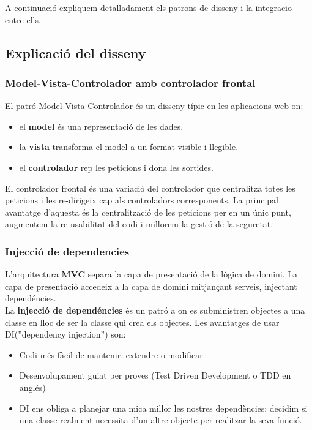 A continuació expliquem detalladament els patrons de disseny i la integracio entre ells.

\subsection{Explicaci\'{o} del disseny}
\subsubsection{Model-Vista-Controlador amb controlador frontal}
El patró Model-Vista-Controlador \'{e}s un disseny t\'{i}pic en les aplicacions web on:
\begin{itemize}
\item el \textbf{model} \'{e}s una representaci\'{o} de les dades.
\item la \textbf{vista} transforma el model a un format visible i llegible.
\item el \textbf{controlador} rep les peticions i dona les sortides.
\end{itemize}
El controlador frontal \'{e}s una variació del controlador que centralitza totes les peticions i les re-dirigeix cap als controladors corresponents. La principal avantatge d'aquesta \'{e}s la centralització de les peticions per en un únic punt, augmentem la re-usabilitat del codi i millorem la gestió de la seguretat.

\subsubsection{Injecció de dependencies}
L'arquitectura \textbf{MVC} separa la capa de presentaci\'{o} de la l\`{o}gica de domini. La capa de presentaci\'{o} accedeix a la capa de domini mitjançant serveis, injectant depend\'{e}ncies. \\

La \textbf{injecci\'{o} de depend\'{e}ncies} \'{e}s un patr\'{o} a on es subministren objectes a una classe en lloc de ser la classe qui crea els objectes.\cite{dependency_injection} Les avantatges de usar DI(''dependency injection'') son:
\begin{itemize}
\item Codi m\'{e}s f\`{a}cil de mantenir, extendre o modificar
\item Desenvolupament guiat per proves (Test Driven Development o TDD en angl\'{e}s)
\item DI ens obliga a planejar una mica millor les nostres depend\`{e}ncies; decidim si una classe realment necessita d'un altre objecte per realitzar la seva funció.
\end{itemize}

